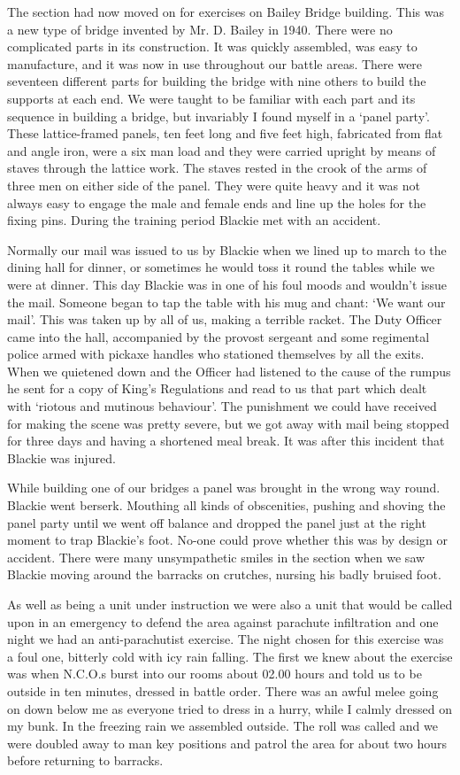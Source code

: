 The section had now moved on for exercises on Bailey Bridge building.
This was a new type of bridge invented by Mr. D. Bailey in 1940.
There were no complicated parts in its construction. It was quickly
assembled, was easy to manufacture, and it was now in use throughout
our battle areas. There were seventeen different parts for building
the bridge with nine others to build the supports at each end. We
were taught to be familiar with each part and its sequence in building
a bridge, but invariably I found myself in a `panel party'. These
lattice-framed panels, ten feet long and five feet high, fabricated
from flat and angle iron, were a six man load and they were carried
upright by means of staves through the lattice work. The staves
rested in the crook of the arms of three men on either side of the
panel. They were quite heavy and it was not always easy to engage the
male and female ends and line up the holes for the fixing pins. During
the training period Blackie met with an accident. 

Normally our mail was issued to us by Blackie when we lined up to
march to the dining hall for dinner, or sometimes he would toss it
round the tables while we were at dinner. This day Blackie was in one
of his foul moods and wouldn't issue the mail. Someone began to tap
the table with his mug and chant: `We want our mail'. This was taken
up by all of us, making a terrible racket. The Duty Officer came into
the hall, accompanied by the provost sergeant and some regimental
police armed with pickaxe handles who stationed themselves by all the
exits. When we quietened down and the Officer had listened to the
cause of the rumpus he sent for a copy of King's Regulations and read
to us that part which dealt with `riotous and mutinous behaviour'.
The punishment we could have received for making the scene was pretty
severe, but we got away with mail being stopped for three days and
having a shortened meal break. It was after this incident that Blackie
was injured. 

While building one of our bridges a panel was brought in the wrong way
round. Blackie went berserk. Mouthing all kinds of obscenities,
pushing and shoving the panel party until we went off balance and
dropped the panel just at the right moment to trap Blackie's foot.
No-one could prove whether this was by design or accident. There were
many unsympathetic smiles in the section when we saw Blackie moving
around the barracks on crutches, nursing his badly bruised foot. 

As well as being a unit under instruction we were also a unit that
would be called upon in an emergency to defend the area against
parachute infiltration and one night we had an anti-parachutist
exercise. The night chosen for this exercise was a foul one, bitterly
cold with icy rain falling. The first we knew about the exercise was
when N.C.O.s burst into our rooms about 02.00 hours and told us to be
outside in ten minutes, dressed in battle order. There was an awful
melee going on down below me as everyone tried to dress in a hurry,
while I calmly dressed on my bunk. In the freezing rain we assembled
outside. The roll was called and we were doubled away to man key
positions and patrol the area for about two hours before returning to
barracks.

